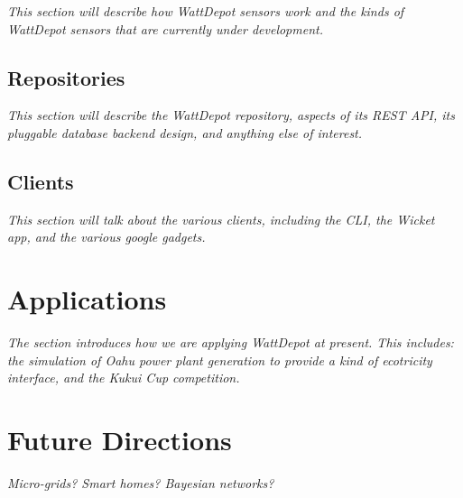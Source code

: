 \documentclass[conference,compsoc]{IEEEtran}
\begin{document}
{\em This section will describe how WattDepot sensors work and the kinds of
  WattDepot sensors that are currently under development.}

\subsection{Repositories}

{\em This section will describe the WattDepot repository, aspects of its
  REST API, its pluggable database backend design, and anything else of
  interest.}

\subsection{Clients}

{\em This section will talk about the various clients, including the CLI,
  the Wicket app, and the various google gadgets.}

\section{Applications}

{\em The section introduces how we are applying WattDepot at present. This
includes: the simulation of Oahu power plant generation to provide a kind
of ecotricity interface, and the Kukui Cup competition.}

\section{Future Directions}

{\em Micro-grids? Smart homes? Bayesian networks?}



\end{document}
